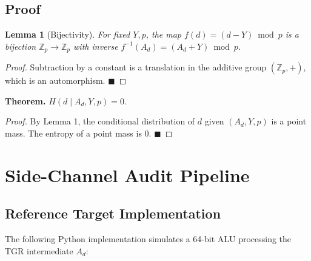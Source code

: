 \documentclass[11pt, a4paper, twoside]{book}
\newtheorem{lemma}[theorem]{Lemma}
\begin{document}
\section{Proof}
\begin{lemma}[Bijectivity]
For fixed $Y, p$, the map $f(d) = (d - Y) \bmod p$ is a bijection $\mathbb{Z}_p \to \mathbb{Z}_p$ with inverse $f^{-1}(A_d) = (A_d + Y) \bmod p$.
\end{lemma}
\begin{proof}
Subtraction by a constant is a translation in the additive group $(\mathbb{Z}_p, +)$, which is an automorphism. $\blacksquare$
\end{proof}

\textbf{Theorem.} $H(d \mid A_d, Y, p) = 0$.
\begin{proof}
By Lemma 1, the conditional distribution of $d$ given $(A_d, Y, p)$ is a point mass. The entropy of a point mass is 0. $\blacksquare$
\end{proof}

\chapter{Side-Channel Audit Pipeline}

\section{Reference Target Implementation}
The following Python implementation simulates a 64-bit ALU processing the TGR intermediate $A_d$:
\end{document}
